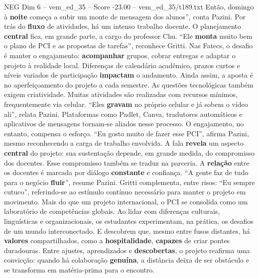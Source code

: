 \begin{textsample}{NEG Dim 6 – vem\_ed\_35 – Score -23.00 – vem\_ed\_35/t189.txt}
Então, domingo à \textbf{noite} começa a subir um monte de mensagem dos alunos”, conta Pazini.
Por trás do \textbf{fluxo} de atividades, há um intenso trabalho docente.
O planejamento \textbf{central} fica, em grande parte, a cargo do professor Chu. “Ele \textbf{monta} muito bem o plano de PCI e as propostas de tarefas”, reconhece Gritti.
Nas Fatecs, o desafio é manter o engajamento: \textbf{acompanhar} grupos, cobrar entregas e adaptar o projeto à realidade local.
Diferenças de calendário acadêmico, prazos curtos e níveis variados de participação \textbf{impactam} o andamento.
Ainda assim, a aposta é no aperfeiçoamento do projeto a cada semestre.
As questões tecnológicas também exigem criatividade.
Muitas atividades são realizadas com recursos mínimos, frequentemente via celular. “Eles \textbf{gravam} no próprio celular e já sobem o vídeo ali”, relata Pazini.
Plataformas como Padlet, Canva, tradutores automáticos e aplicativos de mensagens tornam-se aliados nesse processo.
O engajamento, no entanto, compensa o esforço. “Eu gosto muito de fazer esse PCI”, afirma Pazini, mesmo reconhecendo a carga de trabalho envolvida.
A fala \textbf{revela} um aspecto \textbf{central} do projeto: sua sustentação depende, em grande medida, do compromisso dos docentes.
Esse compromisso também se traduz na parceria.
A \textbf{relação} entre os docentes é marcada por diálogo \textbf{constante} e confiança. “A gente faz de tudo para o negócio \textbf{fluir}”, resume Pazini.
Gritti complementa, entre risos: “Eu sempre cutuco”, referindo-se ao estímulo contínuo necessário para manter o projeto em movimento.
Mais do que um projeto internacional, o PCI se consolida como um laboratório de competências globais.
Ao lidar com diferenças culturais, linguísticas e organizacionais, os estudantes experimentam, na prática, os desafios de um mundo interconectado.
E descobrem que, mesmo entre fusos distantes, há \textbf{valores} compartilhados, como a \textbf{hospitalidade}, \textbf{capazes} de criar pontes duradouras.
Entre ajustes, aprendizados e \textbf{descobertas}, o projeto reafirma uma convicção: quando há colaboração \textbf{genuína}, a distância deixa de ser obstáculo e se transforma em matéria-prima para o encontro.

\end{textsample}
